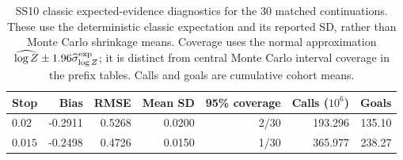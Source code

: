 \begin{table}[t]
\centering
\scriptsize
\caption{SS10 classic expected-evidence diagnostics for the 30 matched continuations. These use the deterministic classic expectation and its reported SD, rather than Monte Carlo shrinkage means. Coverage uses the normal approximation $\widehat{\log Z}\pm1.96\widehat\sigma^{\rm exp}_{\log Z}$; it is distinct from central Monte Carlo interval coverage in the prefix tables. Calls and goals are cumulative cohort means.}
\label{tab:ss10_classic_followup}
\begin{tabular}{lrrrrrr}
\toprule
Stop & Bias & RMSE & Mean SD & 95\% coverage & Calls ($10^6$) & Goals\\
\midrule
$0.02$ & -0.2911 & 0.5268 & 0.0200 & 2/30 & 193.296 & 135.10 \\
$0.015$ & -0.2498 & 0.4726 & 0.0150 & 1/30 & 365.977 & 238.27 \\
\bottomrule
\end{tabular}
\end{table}
